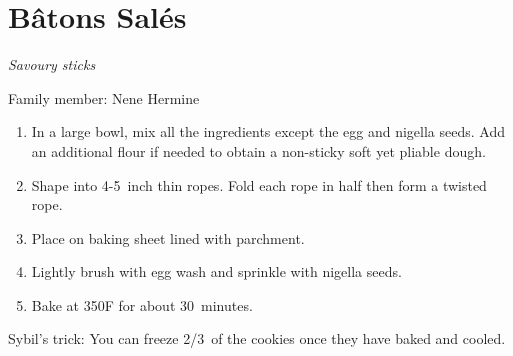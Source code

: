 \chapter{Bâtons Salés}
\label{ch:batonsale}


\textit{Savoury sticks}

Family member: Nene Hermine

\begin{enumerate}
    \item In a large bowl, mix all the ingredients except the egg and nigella seeds. Add an additional flour if needed to obtain a non-sticky soft yet pliable dough.
    \item Shape into 4-5~inch thin ropes. Fold each rope in half then form a twisted rope.
    \item Place on baking sheet lined with parchment.
    \item Lightly brush with egg wash and sprinkle with nigella seeds.
    \item Bake at 350\degree F for about 30~minutes.
\end{enumerate}

Sybil's trick: You can freeze 2/3~of the cookies once they have baked and cooled.
